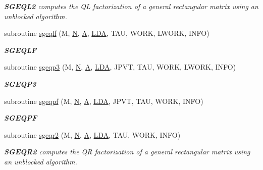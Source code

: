 \begin{DoxyCompactItemize}
\begin{DoxyCompactList}\small\item\em {\bfseries S\+G\+E\+Q\+L2} computes the Q\+L factorization of a general rectangular matrix using an unblocked algorithm. \end{DoxyCompactList}\item 
subroutine \hyperlink{group__realGEcomputational_ga2e9ace4615da2fb5201a1bdeff3ad15c}{sgeqlf} (M, \hyperlink{polmisc_8c_a0240ac851181b84ac374872dc5434ee4}{N}, \hyperlink{classA}{A}, \hyperlink{example__user_8c_ae946da542ce0db94dced19b2ecefd1aa}{L\+D\+A}, T\+A\+U, W\+O\+R\+K, L\+W\+O\+R\+K, I\+N\+F\+O)
\begin{DoxyCompactList}\small\item\em {\bfseries S\+G\+E\+Q\+L\+F} \end{DoxyCompactList}\item 
subroutine \hyperlink{group__realGEcomputational_ga63f9e3af96fa42609e41bf3d77660bdf}{sgeqp3} (M, \hyperlink{polmisc_8c_a0240ac851181b84ac374872dc5434ee4}{N}, \hyperlink{classA}{A}, \hyperlink{example__user_8c_ae946da542ce0db94dced19b2ecefd1aa}{L\+D\+A}, J\+P\+V\+T, T\+A\+U, W\+O\+R\+K, L\+W\+O\+R\+K, I\+N\+F\+O)
\begin{DoxyCompactList}\small\item\em {\bfseries S\+G\+E\+Q\+P3} \end{DoxyCompactList}\item 
subroutine \hyperlink{group__realGEcomputational_gac3876ee65cc8a4a6130d8f1aa9117931}{sgeqpf} (M, \hyperlink{polmisc_8c_a0240ac851181b84ac374872dc5434ee4}{N}, \hyperlink{classA}{A}, \hyperlink{example__user_8c_ae946da542ce0db94dced19b2ecefd1aa}{L\+D\+A}, J\+P\+V\+T, T\+A\+U, W\+O\+R\+K, I\+N\+F\+O)
\begin{DoxyCompactList}\small\item\em {\bfseries S\+G\+E\+Q\+P\+F} \end{DoxyCompactList}\item 
subroutine \hyperlink{group__realGEcomputational_gacd1ae8241f3d12cfa0f1d5ecdbc32eca}{sgeqr2} (M, \hyperlink{polmisc_8c_a0240ac851181b84ac374872dc5434ee4}{N}, \hyperlink{classA}{A}, \hyperlink{example__user_8c_ae946da542ce0db94dced19b2ecefd1aa}{L\+D\+A}, T\+A\+U, W\+O\+R\+K, I\+N\+F\+O)
\begin{DoxyCompactList}\small\item\em {\bfseries S\+G\+E\+Q\+R2} computes the Q\+R factorization of a general rectangular matrix using an unblocked algorithm. \end{DoxyCompactList}\item 

\end{DoxyCompactItemize}
